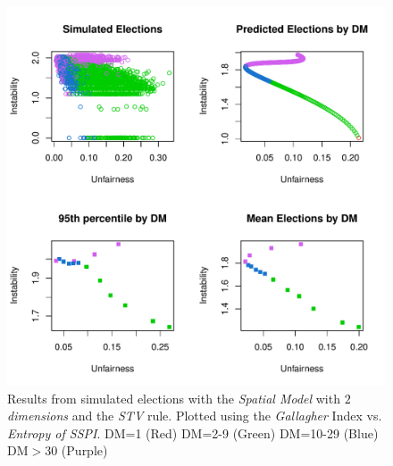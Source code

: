 \documentclass{article}
\begin{document}
\begin{figure}[]
\includegraphics[scale=1.00]{images/stv_spatial2_gallagher_entropysspi.pdf}
\caption{Results from simulated elections with the \emph{Spatial Model} with \emph{$2$ dimensions} and the \emph{STV} rule. Plotted using the \emph{Gallagher} Index vs. \emph{Entropy of SSPI}. DM=1 (Red) DM=2-9 (Green) DM=10-29 (Blue) DM$>$30 (Purple)}
\label{fig:stv_spatial2_entropysspi}
\end{figure}
\end{document}
